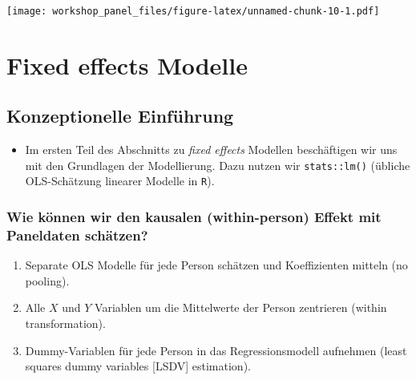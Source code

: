 \documentclass[
]{book}
\providecommand{\tightlist}{%
  \setlength{\itemsep}{0pt}\setlength{\parskip}{0pt}}
\begin{document}
\texttt{[image: workshop\_panel\_files/figure-latex/unnamed-chunk-10-1.pdf]}

\hypertarget{fixed-effects-modelle}{%
\chapter{Fixed effects Modelle}\label{fixed-effects-modelle}}

\hypertarget{konzeptionelle-einfuxfchrung}{%
\section{Konzeptionelle Einführung}\label{konzeptionelle-einfuxfchrung}}

\begin{itemize}
\tightlist
\item
  Im ersten Teil des Abschnitts zu \emph{fixed effects} Modellen beschäftigen wir uns mit den Grundlagen der Modellierung. Dazu nutzen wir \texttt{stats::lm()} (übliche OLS-Schätzung linearer Modelle in \texttt{R}).
\end{itemize}

\hypertarget{wie-kuxf6nnen-wir-den-kausalen-within-person-effekt-mit-paneldaten-schuxe4tzen}{%
\subsection*{Wie können wir den kausalen (within-person) Effekt mit Paneldaten schätzen?}\label{wie-kuxf6nnen-wir-den-kausalen-within-person-effekt-mit-paneldaten-schuxe4tzen}}

\begin{enumerate}
\def\labelenumi{\arabic{enumi})}
\tightlist
\item
  Separate OLS Modelle für jede Person schätzen und Koeffizienten mitteln (no pooling).
\item
  Alle \(X\) und \(Y\) Variablen um die Mittelwerte der Person zentrieren (within transformation).
\item
  Dummy-Variablen für jede Person in das Regressionsmodell aufnehmen (least squares dummy variables {[}LSDV{]} estimation).
\end{enumerate}
\end{document}
